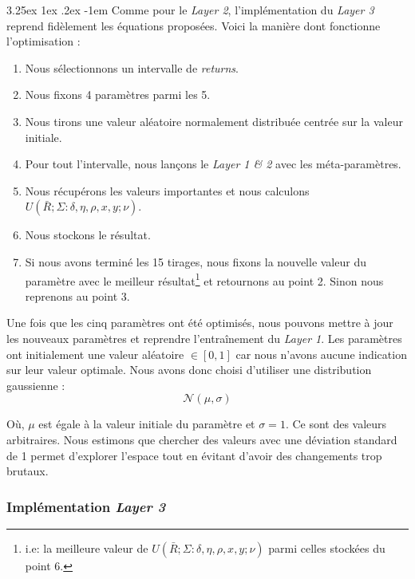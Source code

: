 \documentclass[a4paper, 11pt]{article}
\makeatletter
\renewcommand\paragraph{\@startsection{paragraph}{5}{\z@}%
  {3.25ex \@plus1ex \@minus.2ex}%
  {-1em}%
  {\normalfont\normalsize\bfseries}}
\makeatother
\begin{document}
\paragraph{}
Comme pour le \textit{Layer 2}, l'implémentation du \textit{Layer 3} reprend fidèlement les équations proposées. Voici la manière dont fonctionne
l'optimisation :
\begin{enumerate}
 \item Nous sélectionnons un intervalle de \textit{returns}.
 \item Nous fixons 4 paramètres parmi les 5.
 \item Nous tirons une valeur aléatoire normalement distribuée centrée sur la valeur initiale.
 \item Pour tout l'intervalle, nous lançons le \textit{Layer 1 \& 2} avec les méta-paramètres.
 \item Nous récupérons les valeurs importantes et nous calculons $U(\bar{R};\Sigma : \delta, \eta, \rho, x, y; \nu)$.
 \item Nous stockons le résultat.
 \item Si nous avons terminé les 15 tirages, nous fixons la nouvelle valeur du paramètre avec le meilleur résultat\footnote{i.e: la meilleure valeur de 
 $U(\bar{R};\Sigma : \delta, \eta, \rho, x, y; \nu)$ parmi celles stockées du point 6.} et retournons au point 2. Sinon nous reprenons au point 3.
\end{enumerate}

Une fois que les cinq paramètres ont été optimisés, nous pouvons mettre à jour les nouveaux paramètres et reprendre l'entraînement du \textit{Layer 1}.
Les paramètres ont initialement une valeur aléatoire $\in [0,1]$ car nous n'avons aucune indication sur leur valeur optimale. Nous avons donc choisi d'utiliser une distribution gaussienne :
$$\mathcal{N}(\mu,\sigma)$$

Où, $\mu$ est égale à la valeur initiale du paramètre et $\sigma = 1$. Ce sont des valeurs arbitraires. Nous estimons que chercher des valeurs avec une déviation
standard de 1 permet d'explorer l'espace tout en évitant d'avoir des changements trop brutaux.

\subsubsection{Implémentation \textit{Layer 3}}
\end{document}
